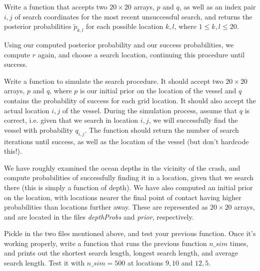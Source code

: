 \begin{problem}
Write a function that accepts two $20 \times 20$ arrays, $p$ and $q$, as well as an index pair $i,j$ of search coordinates for the most recent unsuccessful search, and returns the posterior probabilities $\tilde{p}_{k,l}$ for each possible location $k,l$, where $1 \leq k,l \leq 20$.
\end{problem}

Using our computed posterior probability and our success probabilities, we compute $r$ again, and choose a search location, continuing this procedure until success.

\begin{problem}
Write a function to simulate the search procedure. It should accept two $20 \times 20$ arrays, $p$ and $q$, where $p$ is our initial prior on the location of the vessel and $q$ contains the probability of success for each grid location. It should also accept the actual location $i,j$ of the vessel. During the simulation process, assume that $q$ is correct, i.e. given that we search in location $i,j$, we will successfully find the vessel with probability $q_{i,j}$. The function should return the number of search iterations until success, as well as the location of the vessel (but don't hardcode this!).
\end{problem}

We have roughly examined the ocean depths in the vicinity of the crash, and compute probabilities of successfully finding it in a location, given that we search there (this is simply a function of depth). We have also computed an initial prior on the location, with locations nearer the final point of contact having higher probabilities than locations further away. These are represented as $20 \times 20$ arrays, and are located in the files \emph{depthProbs} and \emph{prior}, respectively.

\begin{problem}
Pickle in the two files mentioned above, and test your previous function. Once it's working properly, write a function that runs the previous function $n\_sim$ times, and prints out the shortest search length, longest search length, and average search length. Test it with $n\_sim = 500$ at locations $9, 10$ and $12, 5$.
\end{problem}
